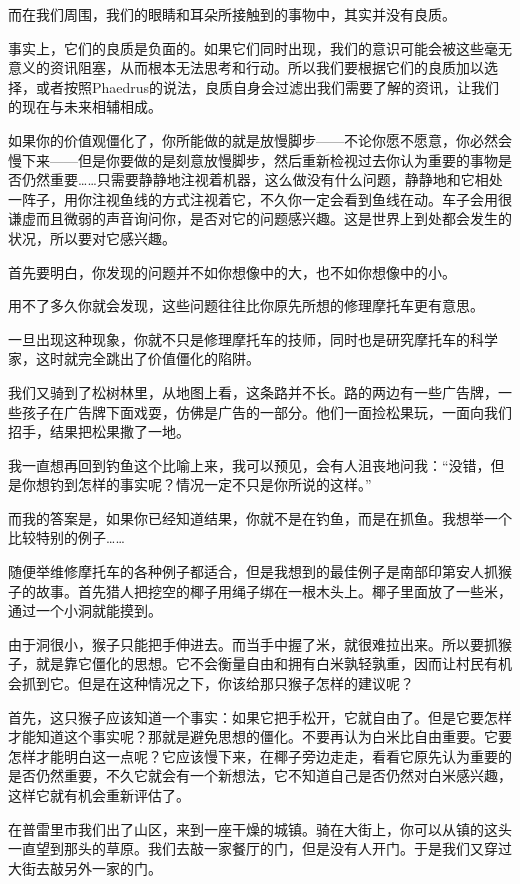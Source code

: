 \documentclass[UTF8]{article}
\begin{document}
\par 而在我们周围，我们的眼睛和耳朵所接触到的事物中，其实并没有良质。
\par 事实上，它们的良质是负面的。如果它们同时出现，我们的意识可能会被这些毫无意义的资讯阻塞，从而根本无法思考和行动。所以我们要根据它们的良质加以选择，或者按照Phaedrus的说法，良质自身会过滤出我们需要了解的资讯，让我们的现在与未来相辅相成。
\par 如果你的价值观僵化了，你所能做的就是放慢脚步——不论你愿不愿意，你必然会慢下来——但是你要做的是刻意放慢脚步，然后重新检视过去你认为重要的事物是否仍然重要……只需要静静地注视着机器，这么做没有什么问题，静静地和它相处一阵子，用你注视鱼线的方式注视着它，不久你一定会看到鱼线在动。车子会用很谦虚而且微弱的声音询问你，是否对它的问题感兴趣。这是世界上到处都会发生的状况，所以要对它感兴趣。
\par 首先要明白，你发现的问题并不如你想像中的大，也不如你想像中的小。
\par 用不了多久你就会发现，这些问题往往比你原先所想的修理摩托车更有意思。
\par 一旦出现这种现象，你就不只是修理摩托车的技师，同时也是研究摩托车的科学家，这时就完全跳出了价值僵化的陷阱。
\par 我们又骑到了松树林里，从地图上看，这条路并不长。路的两边有一些广告牌，一些孩子在广告牌下面戏耍，仿佛是广告的一部分。他们一面捡松果玩，一面向我们招手，结果把松果撒了一地。
\par 我一直想再回到钓鱼这个比喻上来，我可以预见，会有人沮丧地问我：“没错，但是你想钓到怎样的事实呢？情况一定不只是你所说的这样。”
\par 而我的答案是，如果你已经知道结果，你就不是在钓鱼，而是在抓鱼。我想举一个比较特别的例子……
\par 随便举维修摩托车的各种例子都适合，但是我想到的最佳例子是南部印第安人抓猴子的故事。首先猎人把挖空的椰子用绳子绑在一根木头上。椰子里面放了一些米，通过一个小洞就能摸到。
\par 由于洞很小，猴子只能把手伸进去。而当手中握了米，就很难拉出来。所以要抓猴子，就是靠它僵化的思想。它不会衡量自由和拥有白米孰轻孰重，因而让村民有机会抓到它。但是在这种情况之下，你该给那只猴子怎样的建议呢？
\par 首先，这只猴子应该知道一个事实：如果它把手松开，它就自由了。但是它要怎样才能知道这个事实呢？那就是避免思想的僵化。不要再认为白米比自由重要。它要怎样才能明白这一点呢？它应该慢下来，在椰子旁边走走，看看它原先认为重要的是否仍然重要，不久它就会有一个新想法，它不知道自己是否仍然对白米感兴趣，这样它就有机会重新评估了。
\par 在普雷里市我们出了山区，来到一座干燥的城镇。骑在大街上，你可以从镇的这头一直望到那头的草原。我们去敲一家餐厅的门，但是没有人开门。于是我们又穿过大街去敲另外一家的门。
\end{document}
